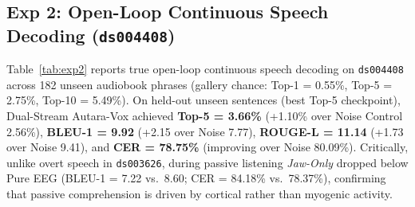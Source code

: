 \documentclass[journal]{IEEEtran}
\begin{document}
\begin{table}[t]
\centering
\caption{Exp 1: Dual-Stream Disentanglement on Held-Out Session 3 of \texttt{ds003626} ($N=1,640$; 4-Word Chance = 25\%, 3-Modality Chance = 33.3\%).}
\label{tab:exp1}
\end{table}

\subsection{Exp 2: Open-Loop Continuous Speech Decoding (\texttt{ds004408})}
Table~\ref{tab:exp2} reports true open-loop continuous speech decoding on \texttt{ds004408} across 182 unseen audiobook phrases (gallery chance: Top-1 = 0.55\%, Top-5 = 2.75\%, Top-10 = 5.49\%). On held-out unseen sentences (best Top-5 checkpoint), Dual-Stream Autara-Vox achieved \textbf{Top-5 = 3.66\%} (+1.10\% over Noise Control 2.56\%), \textbf{BLEU-1 = 9.92} (+2.15 over Noise 7.77), \textbf{ROUGE-L = 11.14} (+1.73 over Noise 9.41), and \textbf{CER = 78.75\%} (improving over Noise 80.09\%). Critically, unlike overt speech in \texttt{ds003626}, during passive listening \emph{Jaw-Only} dropped below Pure EEG (BLEU-1 = 7.22 vs.\ 8.60; CER = 84.18\% vs.\ 78.37\%), confirming that passive comprehension is driven by cortical rather than myogenic activity.
\end{document}
